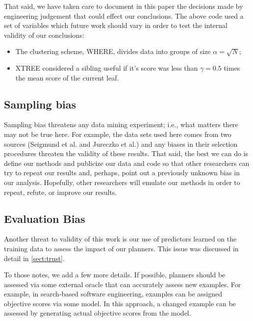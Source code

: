 \documentclass{sig-alternate}
\newcommand{\bi}{\begin{itemize}}
\newcommand{\ei}{\end{itemize}}
\newcommand{\tion}[1]{\textsection\ref{sect:#1}}
\begin{document}
\begin{itemize}
That said, we have taken care to document in this paper the decisions made by engineering
judgement that could effect our conclusions. The above code used a set of variables which future
work should vary in order to test the internal validity of our conclusions:

\bi
\item The clustering scheme, WHERE, divides data into groups of size $\alpha=\sqrt{N}$;
\item XTREE considered a sibling useful if it's score was less than $\gamma=0.5$ times the mean score of the current leaf.
 \ei

\subsection{  Sampling bias} 
Sampling bias threatens any data mining experiment; i.e., what matters
there may not be true here. For example, the data sets used here comes from two sources
(Seigmund et al. and Jureczko et al.) and any biases in their selection procedures
threaten the validity of these results. 
That said,
the best we can do is define our methods and publicize our data and code so that other researchers can
try to repeat our results and, perhaps, point out a previously unknown bias
in our analysis. Hopefully, other researchers will emulate our methods in
order to repeat, refute, or improve our results. 



\subsection{  Evaluation Bias}\label{sect:coc}
Another threat to validity of this work is our use
of predictors learned on the training data to assess the impact of our planners.
This issue was discussed in detail in \tion{trust}. 

To those notes, we add a few more details. If possible, planners should be assessed via some external oracle that can accurately assess new examples. For example, in search-based software engineering,
examples can be assigned objective scores via  some model. In this approach, a changed example can be assessed by
generating actual objective scores from the model. 




\end{itemize}
\end{document}
